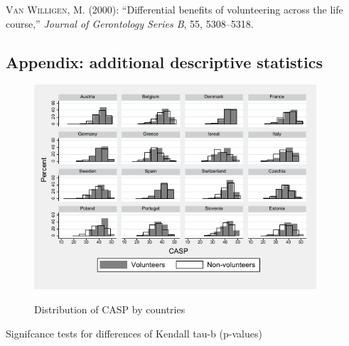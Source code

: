 \documentclass[10pt, letterpaper]{article}
\begin{document}
\begin{spacing}{1.4}
\begin{thebibliography}{87}
\textsc{Van Willigen, M.} (2000): \enquote{Differential benefits of volunteering across the life course,} \emph{Journal of Gerontology Series B}, 55, 5308--5318.


\end{thebibliography}


\begin{spacing}{.9}

\section{Appendix: additional descriptive statistics}


\begin{figure}[H]
 \includegraphics[height=3in]{hist_casp.pdf}
 \centering
 \label{fig:hist_casp}
\caption{Distribution of CASP by countries}
\end{figure}

%	 


\begin{table}[H]
\begin{scriptsize} 
\begin{spacing}{.9}
	 
      \label{KendallCasp} 
      \caption{Signifcance tests for differences of Kendall tau-b (p-values)}
\end{spacing}
\end{scriptsize}
\end{table}


\end{spacing}
\end{spacing}
\end{document}
